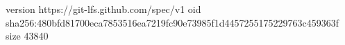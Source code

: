 version https://git-lfs.github.com/spec/v1
oid sha256:480bfd81700eca7853516ea7219fc90e73985f1d4457255175229763c459363f
size 43840
